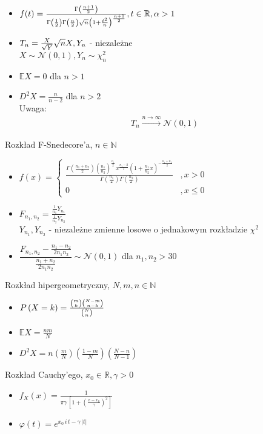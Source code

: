 \documentclass[a4paper,12pt]{report}
\theoremstyle{break}
\theoremstyle{definition}
\theoremstyle{defi}
\theoremstyle{break}
\theoremstyle{defi}
\begin{document}
\begin{multicols}{2}
\begin{itemize}
\item $ f(t)=
\frac{\Gamma\left(\frac{n+1}{2}\right)}{\Gamma\left(\frac{1}{2}\right)\Gamma\left(\frac{n}{2}\right)\sqrt n\left(1+\frac{t^2}{n}\right)^{\frac{n+1}{2}}},\\
t\in \mathbb R ,\alpha>1 $
\item $ T_n=\frac{X}{\sqrt Y}\sqrt n\\
X,Y_n $ - niezależne\\
$ X\sim\mathcal N(0,1),Y_n\sim \chi^2_n $
\item $ \mathbb E X=0 $ dla $ n>1 $
\item $ D^2X=\frac{n}{n-2} $ dla $ n>2 $\\
Uwaga:
\begin{gather*}
T_n\xrightarrow{n\to\infty }\mathcal N(0,1)
\end{gather*}
\end{itemize}
\end{multicols}
{\Large Rozkład F-Snedecore'a, $ n\in \mathbb N  $}
\begin{itemize}
\item $ f(x)=
\left \{
\begin{array}{ll}
\frac{\Gamma\left(\frac{n_1+n_2}{2}\right)\left(\frac{n_1}{n_2}\right)^{\frac{n_1}{2}}x^{\frac{n_1-2}{2}}\left(1+\frac{n_1}{n_2}x\right)^{-\frac{n_1+n_2}{2}}}{\Gamma\left(\frac{n_1}{2}\right)\Gamma\left(\frac{n_2}{2}\right)}&,x>0\\
0&,x\le0
\end{array}
\right . $
\item $ F_{n_1,n_2}=\frac{\frac{1}{n_1}Y_{n_1}}{\frac{1}{n_2}Y_{n_2}} $\\
$ Y_{n_1},Y_{n_2} $ - niezależne zmienne losowe o jednakowym rozkładzie $ \chi^2 $
\item $ \dfrac{F_{n_1,n_2}-\frac{n_1-n_2}{2n_1n_2}}{\frac{n_1+n_2}{2n_1n_2}}\sim\mathcal N(0,1) $ dla $ n_1,n_2>30 $
\end{itemize}

{\Large Rozkład hipergeometryczny, $ N,m,n\in \mathbb N  $}
\begin{multicols}{2}
\begin{itemize}
\item $ P\left(X=k\right)={{\binom{m}{k} {\binom{N-m}{n-k}}}\over \binom{N}{n}} $
\item $ \mathbb E X=\frac{nm}{N} $
\item $ D^2X=n\left(\frac{m}{N}\right)\left(\frac{1-m}{N}\right)\left(\frac{N-n}{N-1}\right) $
\end{itemize}
\end{multicols}
{\Large Rozkład Cauchy'ego, $ x_0\in \mathbb R ,\gamma>0$}
\begin{multicols}{2}
\begin{itemize}
\item $ f_X(x)=\frac{1}{\pi\gamma\,\left[1 + \left(\frac{x-x_0}{\gamma}\right)^2\right]} \! $
\item $ \varphi(t)=e^{x_0\,i\,t-\gamma\,|t|}\! $
\end{itemize}
\end{multicols}
\end{document}
